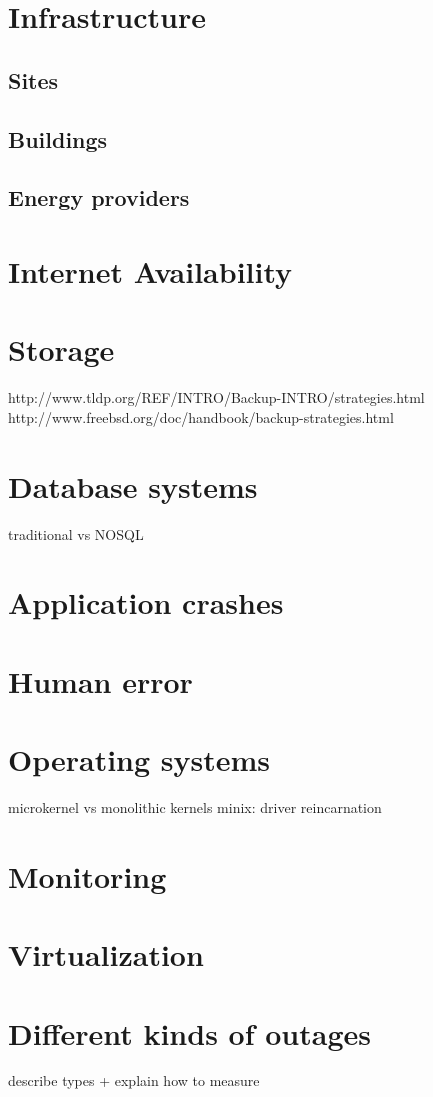 \documentclass[12pt]{report}
\begin{document}
\section{Infrastructure}
\subsection{Sites}
\subsection{Buildings}
\subsection{Energy providers}
\section{Internet Availability}
\section{Storage}
http://www.tldp.org/REF/INTRO/Backup-INTRO/strategies.html
http://www.freebsd.org/doc/handbook/backup-strategies.html
\section{Database systems}
traditional vs NOSQL
\section{Application crashes}
\section{Human error}
\section{Operating systems}
microkernel vs monolithic kernels
minix: driver reincarnation
\section{Monitoring}
\section{Virtualization}
\section{Different kinds of outages}
describe types + explain how to measure
\end{document}
